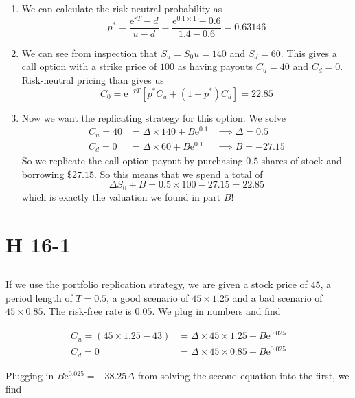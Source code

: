 \documentclass[12pt, letterpaper]{article}
\newcommand{\e}{\mathrm{e}}
\begin{document}
    \begin{enumerate}
    
    \item We can calculate the risk-neutral probability as 
    \[ p^* = \frac{\e^{rT} - d}{u - d} = \frac{\e^{0.1 \times 1} - 0.6}{1.4 - 0.6} = 0.63146    \]
    \item We can see from inspection that \(S_u = S_0 u = 140\) and \(S_d = 60\). This gives a call option with a strike price of \(100\) as having payouts \(C_u = 40\) and \(C_d = 0\). Risk-neutral pricing than gives us 
    \[ C_0 = \e^{-rT} \left[ p^* C_u + (1 - p^*) C_d \right] = 22.85   \]
    \item Now we want the replicating strategy for this option. We solve
    \begin{align*}
    C_u = 40 &= \Delta \times 140 + B  \e^{0.1} &\implies \Delta = 0.5 \\
    C_d = 0 &= \Delta \times 60 + B \e^{0.1} &\implies B = -27.15
    \end{align*}
    So we replicate the call option payout by purchasing \(0.5\) shares of stock and borrowing \(\$27.15\). So this means that we spend a total of 
    \[ \Delta S_0 + B = 0.5 \times 100 - 27.15 = 22.85  \]
    which is exactly the valuation we found in part \(B\)!

    \end{enumerate}

    \section{H 16-1}

    \subsection{}

    If we use the portfolio replication strategy, we are given a stock price of \(45\), a period length of \(T = 0.5\), a good scenario of \(45 \times 1.25\) and a bad scenario of \(45 \times 0.85\). The risk-free rate is \(0.05\). We plug in numbers and find

    \begin{align*}
    C_u = (45 \times 1.25 - 43) &= \Delta \times 45 \times 1.25 + B \e^{0.025} \\
    C_d = 0 &= \Delta \times 45 \times 0.85 + B \e^{0.025} 
    \end{align*}

    Plugging in \(B \e^{0.025} = -38.25 \Delta \) from solving the second equation into the first, we find
\end{document}
